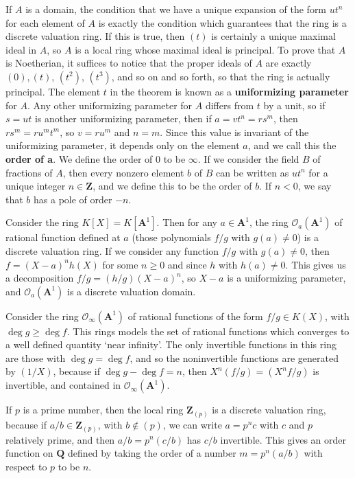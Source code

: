 If $A$ is a domain, the condition that we have a unique expansion of the form $ut^n$ for each element of $A$ is exactly the condition which guarantees that the ring is a discrete valuation ring. If this is true, then $(t)$ is certainly a unique maximal ideal in $A$, so $A$ is a local ring whose maximal ideal is principal. To prove that $A$ is Noetherian, it suffices to notice that the proper ideals of $A$ are exactly $(0), (t)$, $(t^2)$, $(t^3)$, and so on and so forth, so that the ring is actually principal. The element $t$ in the theorem is known as a {\bf uniformizing parameter} for $A$. Any other uniformizing parameter for $A$ differs from $t$ by a unit, so if $s = ut$ is another uniformizing parameter, then if $a = vt^n = rs^m$, then $rs^m = ru^mt^m$, so $v = ru^m$ and $n = m$. Since this value is invariant of the uniformizing parameter, it depends only on the element $a$, and we call this the {\bf order of a}. We define the order of $0$ to be $\infty$. If we consider the field $B$ of fractions of $A$, then every nonzero element $b$ of $B$ can be written as $ut^n$ for a unique integer $n \in \mathbf{Z}$, and we define this to be the order of $b$. If $n < 0$, we say that $b$ has a pole of order $-n$.

\begin{example}
    Consider the ring $K[X] = K[\mathbf{A}^1]$. Then for any $a \in \mathbf{A}^1$, the ring $\mathcal{O}_a(\mathbf{A}^1)$ of rational function defined at $a$ (those polynomials $f/g$ with $g(a) \neq 0$) is a discrete valuation ring. If we consider any function $f/g$ with $g(a) \neq 0$, then $f = (X-a)^nh(X)$ for some $n \geq 0$ and since $h$ with $h(a) \neq 0$. This gives us a decomposition $f/g = (h/g)(X-a)^n$, so $X - a$ is a uniformizing parameter, and $\mathcal{O}_a(\mathbf{A}^1)$ is a discrete valuation domain.
\end{example}

\begin{example}
    Consider the ring $\mathcal{O}_\infty(\mathbf{A}^1)$ of rational functions of the form $f/g \in K(X)$, with $\deg g \geq \deg f$. This rings models the set of rational functions which converges to a well defined quantity `near infinity'. The only invertible functions in this ring are those with $\deg g = \deg f$, and so the noninvertible functions are generated by $(1/X)$, because if $\deg g - \deg f = n$, then $X^n (f/g) = (X^nf/g)$ is invertible, and contained in $\mathcal{O}_\infty(\mathbf{A}^1)$.
\end{example}

\begin{example}
    If $p$ is a prime number, then the local ring $\mathbf{Z}_{(p)}$ is a discrete valuation ring, because if $a/b \in \mathbf{Z}_{(p)}$, with $b \not \in (p)$, we can write $a = p^nc$ with $c$ and $p$ relatively prime, and then $a/b = p^n (c/b)$ has $c/b$ invertible. This gives an order function on $\mathbf{Q}$ defined by taking the order of a number $m = p^n(a/b)$ with respect to $p$ to be $n$.
\end{example}

